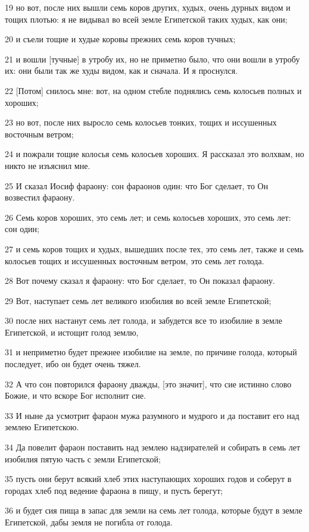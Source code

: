 \par 19 но вот, после них вышли семь коров других, худых, очень дурных видом и тощих плотью: я не видывал во всей земле Египетской таких худых, как они;
\par 20 и съели тощие и худые коровы прежних семь коров тучных;
\par 21 и вошли [тучные] в утробу их, но не приметно было, что они вошли в утробу их: они были так же худы видом, как и сначала. И я проснулся.
\par 22 [Потом] снилось мне: вот, на одном стебле поднялись семь колосьев полных и хороших;
\par 23 но вот, после них выросло семь колосьев тонких, тощих и иссушенных восточным ветром;
\par 24 и пожрали тощие колосья семь колосьев хороших. Я рассказал это волхвам, но никто не изъяснил мне.
\par 25 И сказал Иосиф фараону: сон фараонов один: что Бог сделает, то Он возвестил фараону.
\par 26 Семь коров хороших, это семь лет; и семь колосьев хороших, это семь лет: сон один;
\par 27 и семь коров тощих и худых, вышедших после тех, это семь лет, также и семь колосьев тощих и иссушенных восточным ветром, это семь лет голода.
\par 28 Вот почему сказал я фараону: что Бог сделает, то Он показал фараону.
\par 29 Вот, наступает семь лет великого изобилия во всей земле Египетской;
\par 30 после них настанут семь лет голода, и забудется все то изобилие в земле Египетской, и истощит голод землю,
\par 31 и неприметно будет прежнее изобилие на земле, по причине голода, который последует, ибо он будет очень тяжел.
\par 32 А что сон повторился фараону дважды, [это значит], что сие истинно слово Божие, и что вскоре Бог исполнит сие.
\par 33 И ныне да усмотрит фараон мужа разумного и мудрого и да поставит его над землею Египетскою.
\par 34 Да повелит фараон поставить над землею надзирателей и собирать в семь лет изобилия пятую часть с земли Египетской;
\par 35 пусть они берут всякий хлеб этих наступающих хороших годов и соберут в городах хлеб под ведение фараона в пищу, и пусть берегут;
\par 36 и будет сия пища в запас для земли на семь лет голода, которые будут в земле Египетской, дабы земля не погибла от голода.
